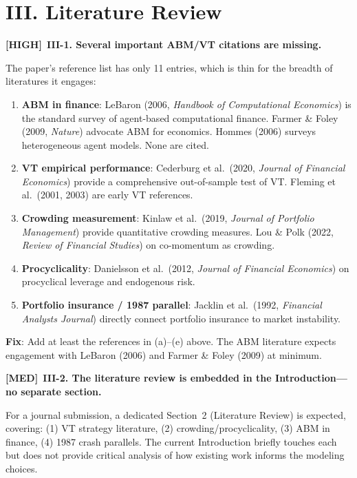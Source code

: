 \documentclass[12pt,a4paper]{article}
\newcommand{\HIGH}{\textbf{\textcolor{errorred}{[HIGH]}}}
\newcommand{\MED}{\textbf{\textcolor{warncolor}{[MED]}}}
\begin{document}
\section*{III. Literature Review}

\HIGH\ \textbf{III-1. Several important ABM/VT citations are missing.}

The paper's reference list has only 11 entries, which is thin for the breadth of literatures it engages:

\begin{enumerate}[label=(\alph*)]
  \item \textbf{ABM in finance}: LeBaron (2006, \emph{Handbook of Computational Economics}) is the standard survey of agent-based computational finance. Farmer \& Foley (2009, \emph{Nature}) advocate ABM for economics. Hommes (2006) surveys heterogeneous agent models. None are cited.
  \item \textbf{VT empirical performance}: Cederburg et al.\ (2020, \emph{Journal of Financial Economics}) provide a comprehensive out-of-sample test of VT. Fleming et al.\ (2001, 2003) are early VT references.
  \item \textbf{Crowding measurement}: Kinlaw et al.\ (2019, \emph{Journal of Portfolio Management}) provide quantitative crowding measures. Lou \& Polk (2022, \emph{Review of Financial Studies}) on co-momentum as crowding.
  \item \textbf{Procyclicality}: Danielsson et al.\ (2012, \emph{Journal of Financial Economics}) on procyclical leverage and endogenous risk.
  \item \textbf{Portfolio insurance / 1987 parallel}: Jacklin et al.\ (1992, \emph{Financial Analysts Journal}) directly connect portfolio insurance to market instability.
\end{enumerate}

\textbf{Fix}: Add at least the references in (a)--(e) above. The ABM literature expects engagement with LeBaron (2006) and Farmer \& Foley (2009) at minimum.

\medskip

\MED\ \textbf{III-2. The literature review is embedded in the Introduction---no separate section.}

For a journal submission, a dedicated Section~2 (Literature Review) is expected, covering: (1) VT strategy literature, (2) crowding/procyclicality, (3) ABM in finance, (4) 1987 crash parallels. The current Introduction briefly touches each but does not provide critical analysis of how existing work informs the modeling choices.
\end{document}
